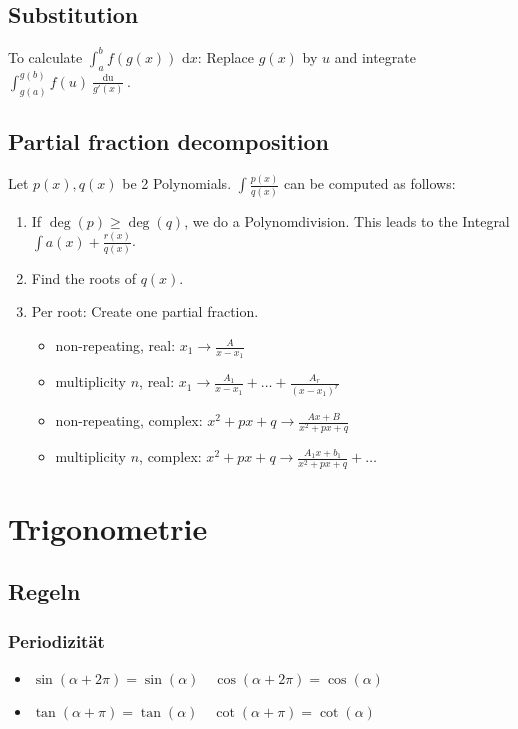 \documentclass[8pt]{extarticle}
\def\dx{\text{ d}x}
\def\dx{\text{ d}x}
\begin{document}
\begin{multicols*}{3}
\subsection{Substitution}
 To calculate $\int_a^b f(g(x)) \dx$: Replace $g(x)$ by $u$ and integrate $\int_{g(a)}^{g(b)} f(u) \frac{\mathop{du}}{g'(x)}$.

\subsection{Partial fraction decomposition}
 Let $p(x), q(x)$ be 2 Polynomials. $\int \frac{p(x)}{q(x)}$ can be computed as follows:
 \begin{enumerate}
  \item If $\deg(p) \ge \deg(q)$, we do a Polynomdivision. This leads to the Integral $\int a(x) + \frac{r(x)}{q(x)}$.
  \item Find the roots of $q(x)$.
  \item Per root: Create one partial fraction.
  \begin{itemize}[left=0pt]
   \item non-repeating, real: $x_1 \to \frac{A}{x - x_1}$
   \item multiplicity $n$, real: $x_1 \to \frac{A_1}{x - x_1} + \ldots + \frac{A_r}{(x-x_1)^r}$ 
   \item non-repeating, complex: $x^2 + px + q \to \frac{Ax + B} {x^2 + px + q}$
   \item multiplicity $n$, complex: $x^2 + px + q \to \frac{A_1x+b_1}{x^2+px+q} + \ldots$
  \end{itemize}
 \end{enumerate}

\section{Trigonometrie}

\subsection{Regeln}
\subsubsection{Periodizität}
\begin{itemize}
 \item $\sin(\alpha + 2 \pi) = \sin(\alpha) \quad \cos(\alpha + 2 \pi) = \cos(\alpha)$
 \item $\tan(\alpha + \pi) = \tan(\alpha) \quad \cot(\alpha + \pi) = \cot(\alpha)$
\end{itemize}


\end{multicols*}
\end{document}

